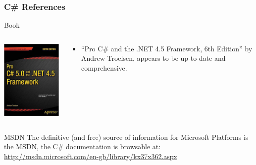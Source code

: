 \documentclass[smaller,handout,table]{beamer}
\begin{document}
\begin{frame}
\frametitle{C\# References}
\begin{block}{Book}
\begin{columns}
\begin{column}{1.7cm}
\includegraphics[width=\textwidth]{csharp.png}
\end{column}
\begin{column}{0.8\textwidth}
\begin{itemize}
\item ``Pro C\# and the .NET 4.5 Framework, 6th Edition'' by Andrew Troelsen,
appears to be up-to-date and comprehensive.
\end{itemize}
\end{column}
\end{columns}
\end{block}
\begin{exampleblock}{MSDN}
The definitive (and free) source of information for Microsoft Platforms is the MSDN, the C\# documentation is browsable at:\\
{\small\url{http://msdn.microsoft.com/en-gb/library/kx37x362.aspx}}
\end{exampleblock}
\end{frame}
\end{document}
